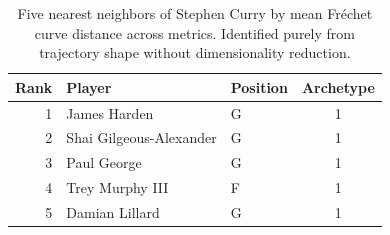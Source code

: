 \begin{table}[htbp]
  \centering\small
  \begin{tabular}{rllc}
    \toprule
    Rank & Player & Position & Archetype \\
    \midrule
    1 & James Harden & G & 1 \\
    2 & Shai Gilgeous-Alexander & G & 1 \\
    3 & Paul George & G & 1 \\
    4 & Trey Murphy III & F & 1 \\
    5 & Damian Lillard & G & 1 \\
    \bottomrule
  \end{tabular}
  \caption{Five nearest neighbors of Stephen Curry by mean Fr\'{e}chet curve distance across metrics. Identified purely from trajectory shape without dimensionality reduction.}
  \label{tab:Stephen_Curry_frechet_curve_neighbors}
\end{table}

